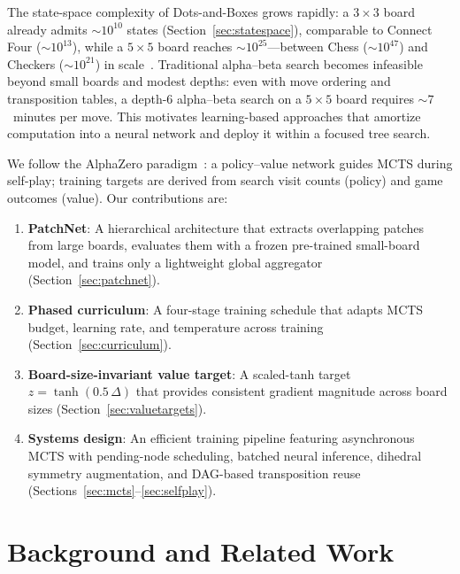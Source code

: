\documentclass[11pt]{article}
\begin{document}
The state-space complexity of Dots-and-Boxes grows rapidly: a $3{\times}3$
board already admits $\sim\!10^{10}$ states (Section~\ref{sec:statespace}),
comparable to Connect Four ($\sim\!10^{13}$), while a $5{\times}5$ board
reaches $\sim\!10^{25}$---between Chess ($\sim\!10^{47}$) and Checkers
($\sim\!10^{21}$) in scale~\cite{barker2012solving}. Traditional
alpha--beta search becomes infeasible beyond small boards and modest
depths: even with move ordering and transposition tables, a depth-6
alpha--beta search on a $5{\times}5$ board requires $\sim\!7$~minutes per
move. This motivates learning-based approaches that amortize computation
into a neural network and deploy it within a focused tree search.

We follow the AlphaZero paradigm~\cite{silver2017mastering,silver2018general}:
a policy--value network guides MCTS during self-play; training targets
are derived from search visit counts (policy) and game outcomes (value).
Our contributions are:

\begin{enumerate}
  \item \textbf{PatchNet}: A hierarchical architecture that extracts
    overlapping patches from large boards, evaluates them with a frozen
    pre-trained small-board model, and trains only a lightweight global
    aggregator (Section~\ref{sec:patchnet}).
  \item \textbf{Phased curriculum}: A four-stage training schedule that
    adapts MCTS budget, learning rate, and temperature across training
    (Section~\ref{sec:curriculum}).
  \item \textbf{Board-size-invariant value target}: A scaled-tanh target
    $z=\tanh(0.5\,\Delta)$ that provides consistent gradient magnitude
    across board sizes (Section~\ref{sec:valuetargets}).
  \item \textbf{Systems design}: An efficient training pipeline
    featuring asynchronous MCTS with pending-node scheduling, batched
    neural inference, dihedral symmetry augmentation, and DAG-based
    transposition reuse (Sections~\ref{sec:mcts}--\ref{sec:selfplay}).
\end{enumerate}

\section{Background and Related Work}
\label{sec:background}
\end{document}
